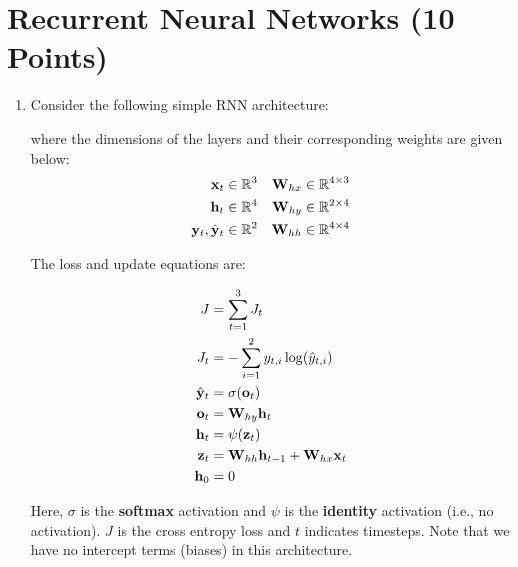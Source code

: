 \clearpage

\section{Recurrent Neural Networks (10 Points)}

\begin{enumerate}

\item Consider the following simple RNN architecture:

\begin{center}
\end{center}

where the dimensions of the layers and their corresponding weights are given below:
\begin{align*}
    \mathbf{x}_t &\in \mathbb{R}^3 &\mathbf{W}_{hx} &\in \mathbb{R}^{4 \times 3}\\
    \mathbf{h}_t &\in \mathbb{R}^4 &\mathbf{W}_{hy} &\in \mathbb{R}^{2 \times 4}\\
    \mathbf{y}_t, \hat{\mathbf{y}}_t &\in \mathbb{R}^2 &\mathbf{W}_{hh} &\in \mathbb{R}^{4 \times 4}
\end{align*}

The loss and update equations are:

\begin{align*}
    J &= \sum_{t=1}^3 J_t\\
    J_t &= -\sum_{i=1}^2 y_{t,i} \log(\hat{y}_{t,i})\\
    \hat{\mathbf{y}}_t &= \sigma(\mathbf{o}_t)\\
    \mathbf{o}_t &= \mathbf{W}_{hy}\mathbf{h}_t\\
    \mathbf{h}_t &= \psi(\mathbf{z}_t)\\
    \mathbf{z}_t &= \mathbf{W}_{hh} \mathbf{h}_{t-1} + \mathbf{W}_{hx}\mathbf{x}_t\\
    \mathbf{h}_0 &= 0
\end{align*}

Here, $\sigma$ is the \textbf{softmax} activation and $\psi$ is the \textbf{identity} activation (i.e., no activation). $J$ is the cross entropy loss and $t$ indicates timesteps. Note that we have no intercept terms (biases) in this architecture.


\end{enumerate}

